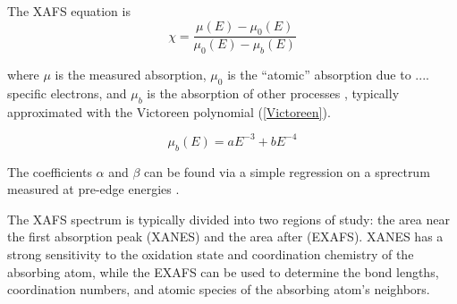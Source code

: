 The XAFS equation is 
\begin{equation}
    \label{XAFS}
    \chi = \dfrac{ \mu(E)- \mu_{0}(E)  }{  \mu_{0}(E) - \mu_{ b  }(E)  } 
\end{equation}

\noindent where $\mu$ is the measured absorption, $ \mu_0 $  is the ``atomic'' absorption due to .... specific electrons, and $ \mu_b $ 
is the absorption of other processes \cite{klementev2000xafs}, typically approximated with the Victoreen polynomial (\ref{Victoreen}).

\begin{equation}
    \label{Victoreen}
    \mu_b(E) = aE^{-3} + bE^{-4}
\end{equation}

\noindent The coefficients $ \alpha $ and $ \beta $ can be found via a simple regression on a sprectrum measured at pre-edge energies \cite{klementev2000xafs}. 

The XAFS spectrum is typically divided into two regions of study: the area near the first absorption peak (XANES) and the area after (EXAFS). XANES has a strong sensitivity to the oxidation state and coordination
chemistry of the absorbing atom, while the EXAFS
can be used to determine the bond lengths, coordination numbers, and atomic species of the absorbing atom's neighbors.


